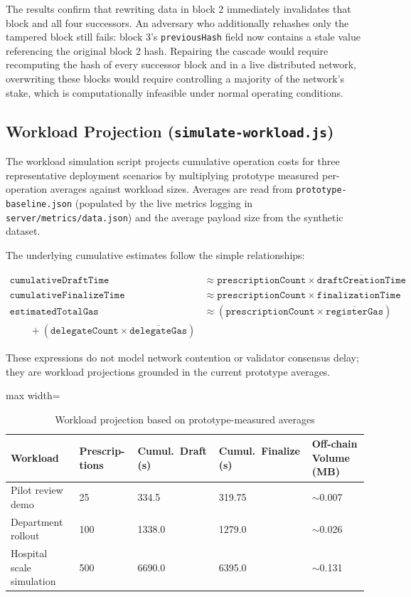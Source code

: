 \documentclass[12pt,a4wide]{report}
\begin{document}
The results confirm that rewriting data in block 2 immediately invalidates that
block and all four successors. An adversary who additionally rehashes only the
tampered block still fails: block 3's \texttt{previousHash} field now contains
a stale value referencing the original block 2 hash. Repairing the cascade would
require recomputing the hash of every successor block and in a live distributed
network, overwriting these blocks would require controlling a majority of the
network's stake, which is computationally infeasible under normal operating conditions.

\subsection{Workload Projection (\texttt{simulate-workload.js})}

The workload simulation script projects cumulative operation costs for three
representative deployment scenarios by multiplying prototype measured per-operation
averages against workload sizes. Averages are read from \texttt{prototype-baseline.json}
(populated by the live metrics logging in \texttt{server/metrics/data.json}) and
the average payload size from the synthetic dataset.

The underlying cumulative estimates follow the simple relationships:

\begin{align*}
\mathtt{cumulativeDraftTime} &\approx \mathtt{prescriptionCount} \times \overline{\mathtt{draftCreationTime}} \\
\mathtt{cumulativeFinalizeTime} &\approx \mathtt{prescriptionCount} \times \overline{\mathtt{finalizationTime}} \\
\mathtt{estimatedTotalGas} &\approx (\mathtt{prescriptionCount} \times \overline{\mathtt{registerGas}}) \\
\qquad {}+ (\mathtt{delegateCount} \times \overline{\mathtt{delegateGas}})
\end{align*}

These expressions do not model network contention or validator consensus delay;
they are workload projections grounded in the current prototype averages.

\begin{table}[H]
\centering
\caption{Workload projection based on prototype-measured averages}
\label{tab:workload}
\begin{adjustbox}{max width=\textwidth}
\begin{tabular}{@{}lp{2.0cm}p{2.2cm}p{2.2cm}p{2.4cm}@{}}
\toprule
\textbf{Workload} & \textbf{Prescrip-tions} & \textbf{Cumul.\ Draft (s)} & \textbf{Cumul.\ Finalize (s)} & \textbf{Off-chain Volume (MB)} \\
\midrule
Pilot review demo         & 25  & 334.5  & 319.75   & $\sim$0.007 \\
Department rollout        & 100 & 1338.0 & 1279.0   & $\sim$0.026 \\
Hospital scale simulation & 500 & 6690.0 & 6395.0  & $\sim$0.131 \\
\bottomrule
\end{tabular}
\end{adjustbox}
\end{table}
\end{document}
